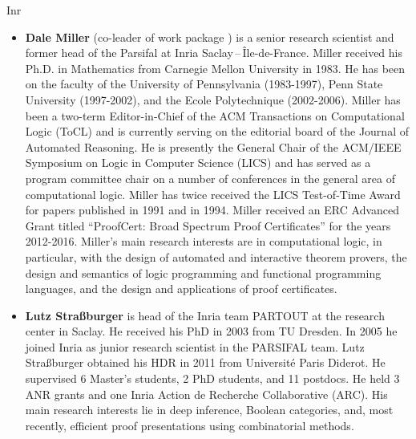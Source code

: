 \begin{sitedescription}{Inr}
\begin{itemize}
\item {\bf Dale Miller} (co-leader of work package ) is a senior research scientist
and former head of the Parsifal at Inria Saclay\,--\,\^Ile-de-France.  Miller
received his Ph.D. in Mathematics from Carnegie Mellon University in 1983.  He
has been on the faculty of the University of Pennsylvania (1983-1997), Penn
State University (1997-2002), and the Ecole Polytechnique (2002-2006). Miller
has been a two-term Editor-in-Chief of the ACM Transactions on Computational
Logic (ToCL) and is currently serving on the editorial board of the Journal of
Automated Reasoning. He is presently the General Chair of the ACM/IEEE Symposium
on Logic in Computer Science (LICS) and has served as a program committee chair
on a number of conferences in the general area of computational logic.  Miller
has twice received the LICS Test-of-Time Award for papers published in 1991 and
in 1994.  Miller received an ERC Advanced Grant titled “ProofCert: Broad
Spectrum Proof Certificates” for the years 2012-2016.  Miller's main research
interests are in computational logic, in particular, with the design of
automated and interactive theorem provers, the design and semantics of logic
programming and functional programming languages, and the design and
applications of proof certificates.

\item{\bf Lutz Straßburger} is head of the Inria team PARTOUT at the research
center in Saclay. He received his PhD in 2003 from TU Dresden. 
In 2005 he joined Inria as junior research scientist in the PARSIFAL
team. Lutz Straßburger obtained his HDR in 2011 from Université Paris
Diderot.  He supervised 6 Master’s students, 2 PhD students, and 11
postdocs. He held 3 ANR grants and one Inria Action de Recherche
Collaborative (ARC).  His main research interests lie in deep
inference, Boolean categories, and, most recently, efficient proof
presentations using combinatorial methods.

\end{itemize}

\end{sitedescription}


